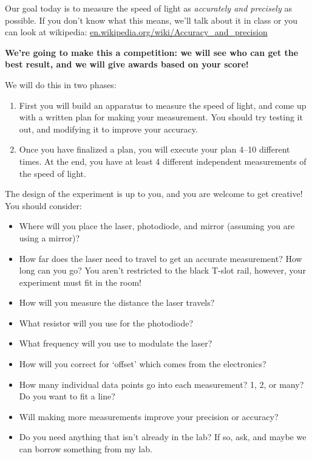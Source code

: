 \documentclass[12pt, letterpaper]{article}
\begin{document}
Our goal today is to measure the speed of light as \emph{accurately and precisely} as possible.
If you don't know what this means, we'll talk about it in class or you can look at wikipedia: \href{https://en.wikipedia.org/wiki/Accuracy_and_precision}{en.wikipedia.org/wiki/Accuracy\_and\_precision}

\textbf{We're going to make this a competition: we will see who can get the best result, and we will give awards based on your score!}

We will do this in two phases:
\begin{enumerate}
	\item First you will build an apparatus to measure the speed of light, and come up with a written plan for making your measurement.
	You should try testing it out, and modifying it to improve your accuracy.
	\item Once you have finalized a plan, you will execute your plan 4--10 different times.
	At the end, you have at least 4 different independent measurements of the speed of light.
\end{enumerate}

The design of the experiment is up to you, and you are welcome to get creative!
You should consider:
\begin{itemize}
	\item Where will you place the laser, photodiode, and mirror (assuming you are using a mirror)?
	\item How far does the laser need to travel to get an accurate measurement?  How long can you go?
	  You aren't restricted to the black T-slot rail, however, your experiment must fit in the room!
	\item How will you measure the distance the laser travels?
	\item What resistor will you use for the photodiode?
	\item What frequency will you use to modulate the laser?
	\item How will you correct for `offset' which comes from the electronics?
	\item How many individual data points go into each measurement?  1, 2, or many?  Do you want to fit a line?
	\item Will making more measurements improve your precision or accuracy?
	\item Do you need anything that isn't already in the lab?  If so, ask, and maybe we can borrow something from my lab.
\end{itemize}
\end{document}
